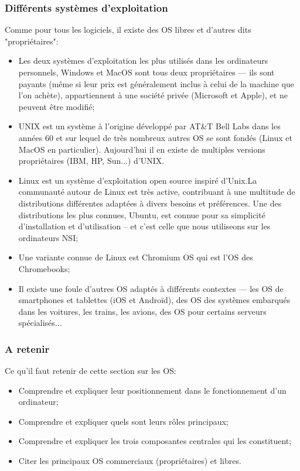 \documentclass[12pt]{article}
\begin{document}
	\subsubsection*{Différents systèmes d'exploitation}
	
	Comme pour tous les logiciels, il existe des OS libres et d'autres dits "propriétaires":
	\begin{itemize}
		\item Les deux systèmes d'exploitation les plus utilisés dans les ordinateurs personnels, Windows et MacOS sont tous deux propriétaires --- ils sont payants (même si leur prix est généralement inclus à celui de la machine que l'on achète), appartiennent à une société privée (Microsoft et Apple), et ne peuvent être modifié;
		\item UNIX est un système à l'origine développé par AT\&T Bell Labs dans les années 60 et sur lequel de très nombreux autres OS se sont fondés (Linux et MacOS en particulier). Aujourd'hui il en existe de multiples versions propriétaires (IBM, HP, Sun...) d'UNIX.
		\item Linux est un système d'exploitation open source inspiré d'Unix.La communauté autour de Linux est très active, contribuant à une multitude de distributions différentes adaptées à divers besoins et préférences. Une des distributions les plus connues, Ubuntu, est connue pour sa simplicité d'installation et d'utilisation -- et c'est celle que nous utiliseons sur les ordinateurs NSI;
		\item Une variante connue de Linux est Chromium OS qui est l'OS des Chromebooks;
		\item Il existe une foule d'autres OS adaptés à différents contextes --- les OS de smartphones et tablettes (iOS et Androïd), des OS des systèmes embarqués dans les voitures, les trains, les avions, des OS pour certains serveurs spécialisés...
	\end{itemize}
	
	\subsubsection*{A retenir}
	
		\begin{MonRet}
		Ce qu'il faut retenir de cette section sur les OS:
		\begin{itemize}
			\item Comprendre et expliquer leur positionnement dans le fonctionnement d'un ordinateur;
			\item Comprendre et expliquer quels sont leurs rôles principaux;
			\item Comprendre et expliquer les trois composantes centrales qui les constituent;
			\item Citer les principaux OS commerciaux (propriétaires) et libres.
		\end{itemize}
	\end{MonRet}
	
\end{document}
